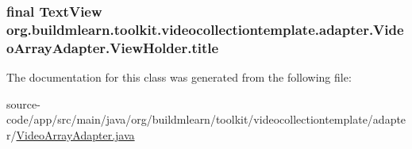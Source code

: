 \subsubsection[{\texorpdfstring{title}{title}}]{\setlength{\rightskip}{0pt plus 5cm}final Text\+View org.\+buildmlearn.\+toolkit.\+videocollectiontemplate.\+adapter.\+Video\+Array\+Adapter.\+View\+Holder.\+title}\hypertarget{classorg_1_1buildmlearn_1_1toolkit_1_1videocollectiontemplate_1_1adapter_1_1VideoArrayAdapter_1_1ViewHolder_ad3a80df0389831aa9818ab6b79da385e}{}\label{classorg_1_1buildmlearn_1_1toolkit_1_1videocollectiontemplate_1_1adapter_1_1VideoArrayAdapter_1_1ViewHolder_ad3a80df0389831aa9818ab6b79da385e}


The documentation for this class was generated from the following file\+:\begin{DoxyCompactItemize}
\item 
source-\/code/app/src/main/java/org/buildmlearn/toolkit/videocollectiontemplate/adapter/\hyperlink{VideoArrayAdapter_8java}{Video\+Array\+Adapter.\+java}\end{DoxyCompactItemize}
